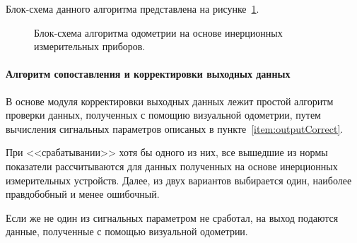Блок-схема данного алгоритма представлена на рисунке~\ref{pic:IMUAlgo}.
\begin{figure}[H]
\caption{Блок-схема алгоритма одометрии на основе инерционных измерительных приборов.}
\label{pic:IMUAlgo}
\end{figure}


\paragraph{Алгоритм сопоставления и корректировки выходных данных}
В основе модуля корректировки выходных данных лежит простой алгоритм проверки данных, полученных с помощию визуальной одометрии, путем вычисления сигнальных параметров описаных в пункте~\ref{item:outputCorrect}. 

При <<срабатывании>> хотя бы одного из них, все вышедшие из нормы показатели рассчитываются для данных полученных на основе инерционных измерительных устройств. Далее, из двух вариантов выбирается один, наиболее правдобобный и менее ошибочный. 

Если же не один из сигнальных параметром не сработал, на выход подаются данные, полученные с помощью визуальной одометрии. 

